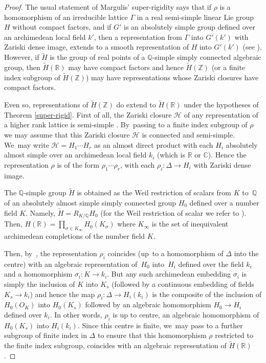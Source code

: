 \documentclass[JEP,XML,SOM,Unicode,published]{cedram}
\theoremstyle{definition}
\newcommand{\field}[1]{\mathbb{#1}}
\newcommand{\Q}{\field{Q}}
\newcommand{\R}{\field{R}}
\newcommand{\Z}{\field{Z}}
\newcommand{\C}{\field{C}}
\let\D\Delta
\let\s\sigma
\begin{document}
\begin{proof} The usual statement of Margulis' super-rigidity says that if $\rho$ is a homomorphism of an irreducible lattice $\Gamma $ in a real semi-simple linear Lie group $H$ without compact factors, and if $G'$ is an absolutely simple group defined over an archimedean local field $k'$, then a representation from $\Gamma $ into $G'(k')$ with Zariski dense image, extends to a smooth
representation of $H$ into $G'(k')$ (see \cite[Chap.\,VIII, Th.\,(C)]{M}). However, if $\tilde H$ is the group of
real points of a $\Q$-simple simply connected algebraic group, then $\tilde H(\R)$ may have compact factors and
hence $\tilde{H}(\Z)$ (or a finite index subgroup of $\tilde{H}(\Z)$) may have representations whose Zariski closures
have compact factors.

Even so, representations of $\tilde{H}(\Z)$ do extend to $\tilde H(\R)$ under the hypotheses of Theorem \ref{super-rigid}.
First of all, the Zariski closure $\mathcal H$ of any representation of a higher rank lattice is semi-simple \cite[Chap.\,VIII, Th.\,(3.10)]{M}. By~passing to a finite index subgroup of $\rho$ we may assume that this Zariski closure $\mathcal H$ is connected and semi-simple. We~may write $\mathcal H =H_1\cdots H_r$ as an almost direct product with each $H_i$ absolutely almost simple over an archimedean local field $k_i$ (which is $\R$ or $\C$). Hence the representation $\rho$ is of the form $\rho_1 \cdots \rho_r$, with each $\rho_i :\D \to H_i$ with Zariski dense image.

The $\Q$-simple group $\tilde{H}$ is obtained as the Weil restriction of scalars from $K$ to~$\Q$ of an absolutely almost simple simply connected group $H_0$ defined over a number field $K$. Namely, $\tilde{H}=R_{K/\Q}H_0$ (for the Weil restriction of scalar we refer to \cite[ Chap.\,6, p.\,115]{Z}). Then, $H(\R)=\prod_{\s \in K_\infty} H_0(K_\s)$ where $K_\infty$ is the set of inequivalent archimedean completions of the number field $K$.

Then, by~\cite[Chap.\,VIII, Th.\,(3.6)\,(ii)\,(a)]{M}, the representation $\rho_i$ coincides (up~to a homomorphism of $\D$ into the centre) with an algebraic representation of~$H_0$ into~$H_i$ defined over the field $k_i$ and a homomorphism $\s_i: K \to k_i$.
But any such archimedean embedding $\s_i$ is simply the inclusion of $K$ into $K_s$ (followed by a continuous embedding of fields $K_s \to k_i$) and hence the map $\rho_i :\D \to H_i(k_i)$ is the composite of the inclusion of $H_0(O_K)$ into $H_0(K_s)$ followed by an algebraic homomorphism $H_0 \to H_i$ defined over $k_i$.
In other words, $\rho_i$ is up to centre, an algebraic homomorphism of $H_0(K_s)$ into $H_i(k_i)$. Since this centre is finite, we~may pass to a further subgroup of finite index in $\D$ to ensure that this homomorphism $\rho $ restricted to the finite index subgroup, coincides with an algebraic representation of $\tilde H(\R)$.
\end{proof}
\end{document}
